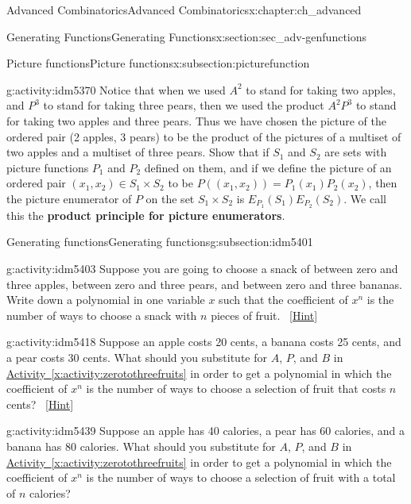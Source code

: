 \documentclass[oneside,10pt,]{book}
\newcommand{\terminology}[1]{\textbf{#1}}
\numberwithin{equation}{chapter}
\begin{document}
\begin{chapterptx}{Advanced Combinatorics}{}{Advanced Combinatorics}{}{}{x:chapter:ch_advanced}
\begin{sectionptx}{Generating Functions}{}{Generating Functions}{}{}{x:section:sec_adv-genfunctions}
\begin{subsectionptx}{Picture functions}{}{Picture functions}{}{}{x:subsection:picturefunction}
\begin{activity}{}{g:activity:idm5370}%
Notice that when we used \(A^2\) to stand for taking two apples, and \(P^3\) to stand for taking three pears, then we used the product \(A^2P^3\) to stand for taking two apples and three pears. Thus we have chosen the picture of the ordered pair (2 apples, 3 pears) to be the product of the pictures of a multiset of two apples and a multiset of three pears. Show that if \(S_1\) and \(S_2\) are sets with picture functions \(P_1\) and \(P_2\) defined on them, and if we define the picture of an ordered pair \((x_1,x_2)\in S_1\times S_2\) to be \(P((x_1,x_2))= P_1(x_1)P_2(x_2)\), then the picture enumerator of \(P\) on the set \(S_1\times S_2\) is \(E_{P_1}(S_1)E_{P_2}(S_2)\). We call this the \terminology{product principle for picture enumerators}.%
\end{activity}
\end{subsectionptx}
%
%
\typeout{************************************************}
\typeout{************************************************}
%
\begin{subsectionptx}{Generating functions}{}{Generating functions}{}{}{g:subsection:idm5401}
\begin{activity}{}{g:activity:idm5403}%
Suppose you are going to choose a snack of between zero and three apples, between zero and three pears, and between zero and three bananas. Write down a polynomial in one variable \(x\) such that the coefficient of \(x^n\) is the number of ways to choose a snack with \(n\) pieces of fruit.%
\qquad~\hfill{\tiny\hyperlink{g:hint:idm5409-back}{[Hint]}}\end{activity}
\begin{activity}{}{g:activity:idm5418}%
Suppose an apple costs 20 cents, a banana costs 25 cents, and a pear costs 30 cents. What should you substitute for \(A\), \(P\), and \(B\) in \hyperref[x:activity:zerotothreefruits]{Activity~\ref{x:activity:zerotothreefruits}} in order to get a polynomial in which the coefficient of \(x^n\) is the number of ways to choose a selection of fruit that costs \(n\) cents?%
\qquad~\hfill{\tiny\hyperlink{g:hint:idm5427-back}{[Hint]}}\end{activity}
\begin{activity}{}{g:activity:idm5439}%
Suppose an apple has 40 calories, a pear has 60 calories, and a banana has 80 calories. What should you substitute for \(A\), \(P\), and \(B\) in \hyperref[x:activity:zerotothreefruits]{Activity~\ref{x:activity:zerotothreefruits}} in order to get a polynomial in which the coefficient of \(x^n\) is the number of ways to choose a selection of fruit with a total of \(n\) calories?%

\end{activity}
\end{subsectionptx}
\end{sectionptx}
\end{chapterptx}
\end{document}
